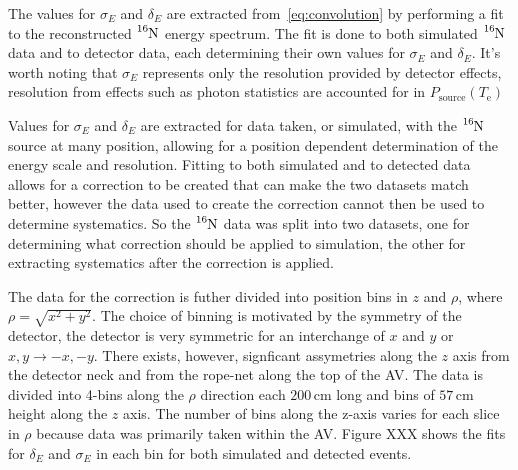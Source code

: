 The values for $\sigma_{E}$ and $\delta_{E}$ are extracted from~\eqref{eq:convolution}
by performing a fit to the reconstructed $\ce{^{16}N}$ energy spectrum.
The fit is done to both simulated $\ce{^{16}N}$ data and to detector data,
each determining their own values for $\sigma_{E}$ and $\delta_{E}$. It's worth
noting that $\sigma_{E}$ represents only the resolution provided by detector
effects, resolution from effects such as photon statistics are accounted
for in $P_\mathrm{source}(T_{\mathrm{e}})$

Values for $\sigma_{E}$ and $\delta_{E}$ are extracted for data taken, or simulated, with
the $\ce{^{16}N}$ source at many position, allowing for a position dependent
determination of the energy scale and resolution.
Fitting to both simulated and to detected data allows for a correction to
be created that can make the two datasets match better, however the data
used to create the correction cannot then be used to determine systematics.
So the $\ce{^{16}N}$ data was split into two datasets, one for determining
what correction should be applied to simulation, the other for extracting systematics
after the correction is applied.

The data for the correction is futher divided into position bins in $z$ and
$\rho$, where $\rho = \sqrt{x^{2} + y^{2}}$. The choice of binning is motivated
by the symmetry of the detector, the detector is very symmetric for an interchange
of $x$ and $y$ or $x,y \rightarrow -x,-y$.
There exists, however, signficant assymetries along the $z$ axis
from the detector neck and from the rope-net along the top of the AV.
The data is divided into 4-bins along the $\rho$ direction each $200$\,cm long
and bins of $57$\,cm height along the $z$ axis. The number of bins along the
z-axis varies for each slice in $\rho$ because data was primarily taken within
the AV.\@
Figure XXX shows the fits for $\delta_{E}$ and $\sigma_{E}$ in each bin for
both simulated and detected events.

